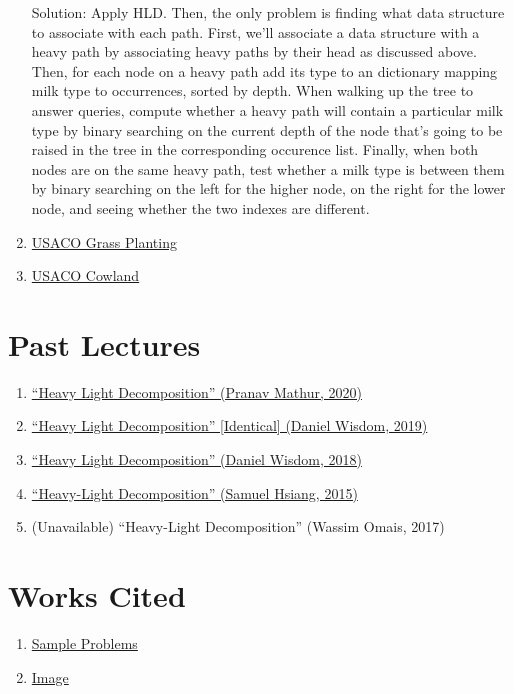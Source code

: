 \documentclass[11pt, oneside]{article}
\begin{document}
\begin{enumerate}
  Solution: Apply HLD. Then, the only problem is finding what data structure to associate with each path.
  First, we'll associate a data structure with a heavy path by associating heavy paths by their head
  as discussed above. Then, for each node on a heavy path add its type to an dictionary
  mapping milk type to occurrences, sorted by depth. When walking up the tree to answer queries,
  compute whether a heavy path will contain a particular milk type by binary searching on the
  current depth of the node that's going to be raised in the tree in the corresponding occurence list.
  Finally, when both nodes are on the same heavy path, test whether a milk type is between them
  by binary searching on the left for the higher node, on the right for the lower node,
  and seeing whether the two indexes are different.

  \item \href{http://www.usaco.org/index.php?page=viewproblem2&cpid=102}{USACO Grass Planting}
  \item \href{http://www.usaco.org/index.php?page=viewproblem2&cpid=921}{USACO Cowland}

\end{enumerate}

\section{Past Lectures}

\begin{enumerate}
  \item \href{}{``Heavy Light Decomposition'' (Pranav Mathur, 2020)}
  \item \href{https://activities.tjhsst.edu/sct/lectures/1819/2019_3_15_HLD.pdf}{``Heavy Light Decomposition'' [Identical] (Daniel Wisdom, 2019)}
  \item \href{https://activities.tjhsst.edu/sct/lectures/1718/2018-03-23_Heavy_Light_Decomposition.pdf}{``Heavy Light Decomposition'' (Daniel Wisdom, 2018)}
  \item \href{https://activities.tjhsst.edu/sct/lectures/1415/SCT_Heavy-Light_Decomposition.pdf}{``Heavy-Light Decomposition'' (Samuel Hsiang, 2015)}
  \item (Unavailable) ``Heavy-Light Decomposition'' (Wassim Omais, 2017)
\end{enumerate}

\section{Works Cited}

\begin{enumerate}
  \item \href{https://blog.anudeep2011.com/heavy-light-decomposition/}{Sample Problems}
  \item \href{www.csie.ntnu.edu.tw/ u91029/Heavy-LightDecomposition1.png}{Image}
\end{enumerate}
\end{document}
